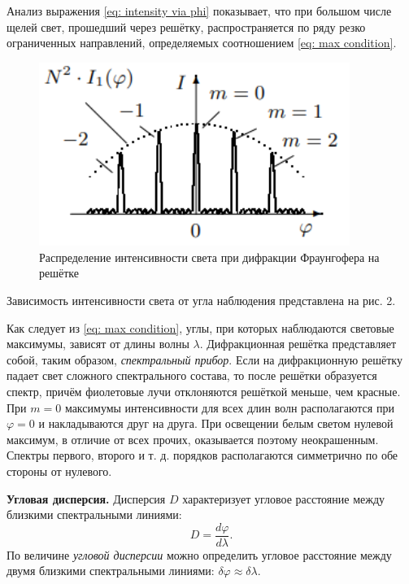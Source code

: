 \documentclass[a4paper,12pt]{article}
\begin{document}
Анализ выражения \eqref{eq: intensity via phi} показывает, что при большом числе щелей свет, прошедший через решётку, распространяется по ряду резко ограниченных направлений, определяемых соотношением \eqref{eq: max condition}. 

\begin{figure}\label{fig: Intensity distribution}
    \begin{center}
    \vspace{-20pt}
        \includegraphics[width = 0.9\textwidth]{Intensity distribution.png}
    \end{center}
    \caption{Распределение интенсивности света при дифракции Фраунгофера на решётке}
\end{figure}
Зависимость интенсивности света от угла наблюдения представлена на рис. 2.

Как следует из \eqref{eq: max condition}, углы, при которых наблюдаются световые максимумы, зависят от длины волны $\lambda$. Дифракционная решётка представляет собой, таким образом, \textit{спектральный прибор}. Если на дифракционную решётку падает свет сложного спектрального состава, то после решётки образуется спектр, причём фиолетовые лучи отклоняются решёткой меньше, чем красные. При $m = 0$ максимумы интенсивности для всех длин волн располагаются при $\varphi = 0$ и накладываются друг на друга. При освещении белым светом нулевой максимум, в отличие от всех прочих, оказывается поэтому неокрашенным. Спектры первого, второго и т. д. порядков располагаются симметрично по обе стороны от нулевого.

\textbf{Угловая дисперсия.} Дисперсия $D$ характеризует угловое расстояние между близкими спектральными линиями:
\begin{equation}\label{eq: angle dispersion}
    D = \frac{d\varphi}{d\lambda}.
\end{equation}
По величине \textit{угловой дисперсии} можно определить угловое расстояние между двумя близкими спектральными линиями: $\delta \varphi \approx \delta \lambda$.
\end{document}
